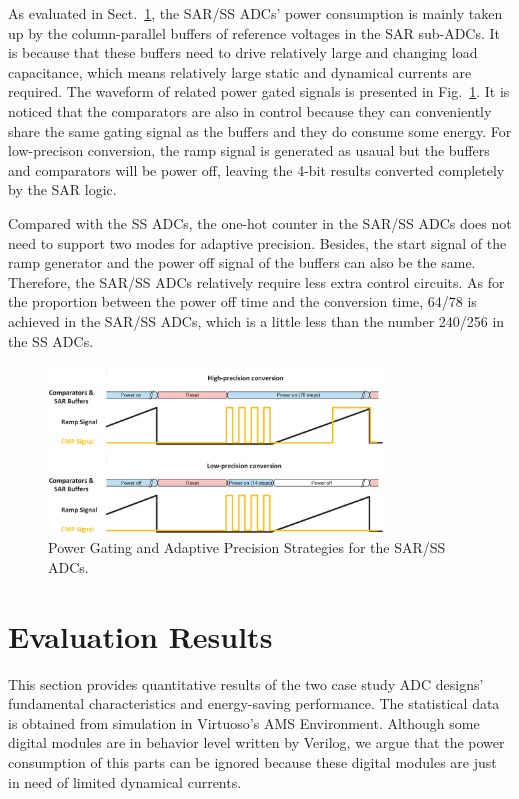 \documentclass[conference]{IEEEtran}
\begin{document}
As evaluated in Sect.~\ref{result}, the SAR/SS ADCs’ power consumption is mainly taken up by the column-parallel buffers of reference voltages in the SAR sub-ADCs.
It is because that these buffers need to drive relatively large and changing load capacitance, which means relatively large static and dynamical currents are required.
The waveform of related power gated signals is presented in Fig.~\ref{SAR_pg}. It is noticed that the comparators are also in control because they can conveniently share the same gating signal 
as the buffers and they do consume some energy. For low-precison conversion, the ramp signal is generated as usaual but the buffers and comparators will be power off, 
leaving the 4-bit results converted completely by the SAR logic. 

Compared with the SS ADCs, the one-hot counter in the SAR/SS ADCs does not need to support two modes for adaptive precision. 
Besides, the start signal of the ramp generator and the power off signal of the buffers can also be the same. Therefore, the SAR/SS ADCs relatively require less extra control circuits.
As for the proportion between the power off time and the conversion time, 64/78 is achieved in the SAR/SS ADCs, which is a little less than the number 240/256 in the SS ADCs.

\begin{figure}[htbp]
	\centerline{\includegraphics[width=3.5in]{./Figures/SAR_pg.eps}}
	\caption{Power Gating and Adaptive Precision Strategies for the SAR/SS ADCs.}
	\label{SAR_pg}
\end{figure} 

\section{Evaluation Results}\label{result}

This section provides quantitative results of the two case study ADC designs’ fundamental characteristics and energy-saving performance. 
The statistical data is obtained from simulation in Virtuoso’s AMS Environment. 
Although some digital modules are in behavior level written by Verilog, we argue that the power consumption of this parts can be ignored 
because these digital modules are just in need of limited dynamical currents.
\end{document}

